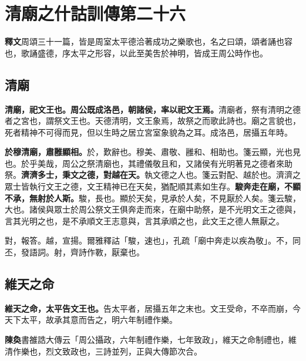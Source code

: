 \chapter{清廟之什詁訓傳第二十六}

\begin{quoting}\textbf{釋文}周頌三十一篇，皆是周室太平德洽著成功之樂歌也，名之曰頌，頌者誦也容也，歌誦盛德，序太平之形容，以此至美吿於神明，皆成王周公時作也。\end{quoting}

\section{清廟}


\textbf{清廟，祀文王也。周公既成洛邑，朝諸侯，率以祀文王焉。}{\footnotesize 清廟者，祭有清明之德者之宮也，謂祭文王也。天德清明，文王象焉，故祭之而歌此詩也。廟之言貌也，死者精神不可得而見，但以生時之居立宮室象貌為之耳。成洛邑，居攝五年時。}

\textbf{於穆清廟，肅雝顯相。}{\footnotesize 於，歎辭也。穆美、肅敬、雝和、相助也。箋云顯，光也見也。於乎美哉，周公之祭清廟也，其禮儀敬且和，又諸侯有光明著見之德者來助祭。}\textbf{濟濟多士，秉文之德，對越在天。}{\footnotesize 執文德之人也。箋云對配、越於也。濟濟之眾士皆執行文王之德，文王精神已在天矣，猶配順其素如生存。}\textbf{駿奔走在廟，不顯不承，無射於人斯。}{\footnotesize 駿，長也。顯於天矣，見承於人矣，不見厭於人矣。箋云駿，大也。諸侯與眾士於周公祭文王俱奔走而來，在廟中助祭，是不光明文王之德與，言其光明之也，是不承順文王志意與，言其承順之也，此文王之德人無厭之。}

\begin{quoting}對，報答。越，宣揚。爾雅釋詁「駿，速也」，孔疏「廟中奔走以疾為敬」。不，同丕，發語詞。射，齊詩作斁，厭棄也。\end{quoting}

\section{維天之命}


\textbf{維天之命，太平告文王也。}{\footnotesize 告太平者，居攝五年之末也。文王受命，不卒而崩，今天下太平，故承其意而告之，明六年制禮作樂。}

\begin{quoting}\textbf{陳奐}書雒誥大傳云「周公攝政，六年制禮作樂，七年致政」，維天之命制禮也，維清作樂也，烈文致政也，三詩並列，正與大傳節次合。\end{quoting}


